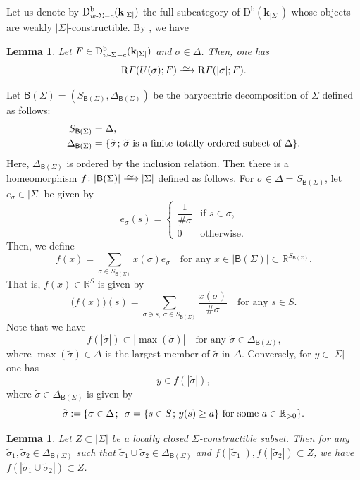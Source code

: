 \documentclass[JEP,XML,SOM,Unicode]{cedram}
\newcommand{\isom}{\xrightarrow{{\raisebox{-.6ex}[0ex][0ex]{$\mspace{1mu}\textstyle\sim\mspace{2mu}$}}}}
\let\cl\colon
\let \tilde\oldtilde
\let\tilde\widetilde
\newcommand{\semicolon}{\nobreak \mskip2mu\mathpunct{}\nonscript\mkern-\thinmuskip{;}\mskip6mu plus1mu\relax}
\newcommand{\set}[2]{{\left\{#1\semicolon #2 \right\}}}
\newcommand{\bl}{\bigl(}
\newcommand{\br}{\bigr)}
\theoremstyle{plain}
\newtheorem{lemma}[theorem]{Lemma}
\theoremstyle{definition}
\newcommand{\R}{\mathbb{R}}
\newcommand{\derived}[1]{\mathrm{#1}}
\newcommand{\derd}{\derived{D}}
\newcommand{\derr}{\derived{R}}
\newcommand{\BDC}{\derd^{\mathrm{b}}}
\newcommand{\field}{\mathbf{k}}\let\cor\field
\newcommand{\rsect}{\derr\varGamma}
\newcommand{\Bd}{\mathsf{B}}
\newcommand{\defeq}{\mathbin{:=}}\let \seteq\defeq
\begin{document}
Let us denote by $\BDC_{w\text-\Sigma-c}(\field_{|\Sigma|})$ the full subcategory of $\BDC(\field_{|\Sigma|})$ whose objects are weakly $|\Sigma|$-constructible.
By \cite[Prop.\,8.1.4]{KS90}, we have

\begin{lemma} \label{lem:Usigma}
Let $F\in\BDC_{w\text-\Sigma-c}(\field_{|\Sigma|})$ and $\sigma\in\Delta$. Then, one has
\[\rsect(U(\sigma);F)\isom\rsect(|\sigma|;F).\]
\end{lemma}

Let $\Bd(\Sigma)=(S_{\Bd(\Sigma)}, \Delta_{\Bd(\Sigma)})$ be the barycentric
decomposition of $\Sigma$ defined as follows:
\begin{align*}
S_{\Bd(\Sigma)}&=\Delta,\\
\Delta_{\Bd(\Sigma)}&=\set{\tilde\sigma}
{\text{$\tilde\sigma$ is a finite totally ordered subset of $\Delta$}}.
\end{align*}
Here, $\Delta_{\Bd(\Sigma)}$ is ordered by the inclusion relation.
Then there is a homeomorphism
$f\cl|\Bd(\Sigma)|\isom |\Sigma|$
defined as follows.
For $\sigma\in\Delta=S_{\Bd(\Sigma)}$, let $e_\sigma\in|\Sigma|$ be given by
\[e_\sigma(s)=
\begin{cases}
\dfrac{1}{\#\sigma}&\text{if $s\in\sigma$,}\\[1ex]
0&\text{otherwise.}
\end{cases}
\]
Then, we define\vspace*{-3pt}
\[
f(x)=\sum_{\sigma\in S_{\Bd(\Sigma)}}x(\sigma)e_{\sigma}
\quad\text{for any $x\in |\Bd(\Sigma)|\subset\R^{S_{\Bd(\Sigma)}}$.}
\]
That is, $f(x)\in\R^S$ is given by\vspace*{-3pt}
\[
\bl f(x)\br(s)=\sum_{\sigma\owns s,\ \sigma\in S_{\Bd(\Sigma)}}\dfrac{x(\sigma)}{\#\sigma}
\quad\text{for any $s\in S$.}
\]
Note that we have\vspace*{-3pt}
\begin{equation}
f(|\tilde\sigma|)\subset |\max(\tilde\sigma)|\quad\text{for any $\tilde\sigma\in \Delta_{\Bd(\Sigma)}$,}\label{eq:bary}
\end{equation}
where $\max(\tilde\sigma)\in\Delta$ is the largest member of $\tilde\sigma$ in $\Delta$.
Conversely, for $y\in|\Sigma|$ one has\vspace*{-3pt}
\[y\in f(|\tilde\sigma|),\]
where $\tilde\sigma\in\Delta_{\Bd(\Sigma)}$ is given by
\[\tilde\sigma\defeq\set{\sigma\in\Delta}{\text{
$\sigma=\set{s\in S}{y(s)\ge a}$
for some $a\in\R_{>0}$}}.\]

\begin{lemma}\label{sublemma}
Let $Z\subset|\Sigma|$ be a locally closed $\Sigma$-constructible subset.
Then for any
$\tilde\sigma_1,\tilde\sigma_2\in \Delta_{\Bd(\Sigma)}$ such that
$\tilde\sigma_1\cup\tilde\sigma_2\in\Delta_{\Bd(\Sigma)}$ and
$f(|\tilde\sigma_1|),f(|\tilde\sigma_2|)\subset Z$,
we have
\hbox{$f(|\tilde\sigma_1\cup\tilde\sigma_2|)\subset Z$}.
\end{lemma}
\end{document}
